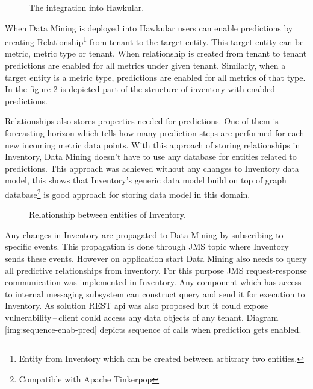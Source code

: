     \begin{figure}[H]
        \begin{center}
            \caption{The integration into Hawkular.}
            \label{img:hawkular-interaction}
        \end{center}
    \end{figure}

    When Data Mining is deployed into Hawkular users can enable predictions by creating Relationship\footnote{Entity
    from Inventory which can be created between arbitrary two entities.} from tenant to the target entity. This target
    entity can be metric, metric type or tenant. When relationship is created from tenant to tenant predictions are
    enabled for all metrics under given tenant. Similarly, when a target entity is a metric type, predictions are
    enabled for all metrics of that type. In the figure \ref{img:relationship} is depicted part of the structure of
    inventory with enabled predictions.

    Relationships also stores properties needed for predictions. One of them is
    forecasting horizon which tells how many prediction steps are performed for each new incoming metric data
    points. With this approach of storing relationships in Inventory, Data Mining doesn't have to use any database for
    entities related to predictions. This approach was achieved without any changes to Inventory data
    model, this shows that Inventory's generic data model build on top of graph database\footnote{Compatible with
    Apache Tinkerpop} is good approach for storing data model in this domain.

    \begin{figure}[H]
        \begin{center}
            \caption{Relationship between entities of Inventory.}
            \label{img:relationship}
        \end{center}
    \end{figure}

    Any changes in Inventory are propagated to Data Mining by subscribing to specific events. This propagation is done
    through JMS topic where Inventory sends these events. However on application start Data Mining also needs to query
    all predictive relationships from inventory. For this purpose JMS request-response communication was implemented in
    Inventory. Any component which has access to internal messaging subsystem can construct query and send it for
    execution to Inventory. As solution REST api was also proposed but it could expose vulnerability\,--\,client
    could access any data objects of any tenant. Diagram \ref{img:sequence-enab-pred} depicts sequence of calls when
    prediction gets enabled.

